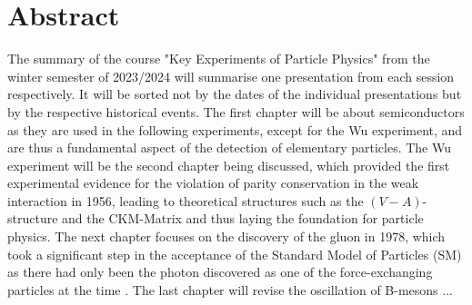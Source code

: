 \thispagestyle{plain}

\section*{Abstract}

The summary of the course "Key Experiments of Particle Physics" from the winter semester of 2023/2024 will summarise one presentation from each session respectively.
It will be sorted not by the dates of the individual presentations but by the respective historical events.
The first chapter will be about semiconductors as they are used in the following experiments, except for the Wu experiment, and are thus a fundamental aspect of the detection of elementary particles.
The Wu experiment will be the second chapter being discussed, which provided the first experimental evidence for the violation of parity conservation in the weak interaction in 1956, leading to theoretical structures such as the $(V-A)$-structure and the CKM-Matrix and thus laying the foundation for particle physics.
The next chapter focuses on the discovery of the gluon in 1978, which took a significant step in the acceptance of the Standard Model of Particles (SM) \cite{Gaillard1998ui} as there had only been the photon discovered as one of the force-exchanging particles at the time \cite{DesyGluon}.
The last chapter will revise the oscillation of B-mesons ...